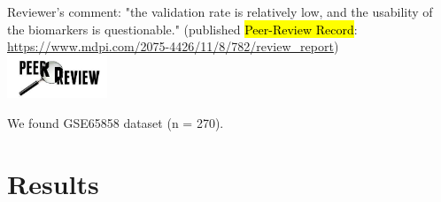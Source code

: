 \documentclass[
paper=landscape,
paper=160mm:90mm, %
fontsize=11pt, %
pagesize, %
parskip=half-, %
]{scrartcl} %
\theoremstyle{mythmstyle} %
\begin{document}
Reviewer's comment: "the validation rate is relatively low, and the usability of the biomarkers is questionable." (published \hl{Peer-Review Record}: \url{https://www.mdpi.com/2075-4426/11/8/782/review_report})\\

\includegraphics[width=3cm]{peer_review.png}

We found GSE65858 dataset (n = 270).

\clearpage
\section{Results} %


\clearpage

\thispagestyle{headings}
\end{document}
